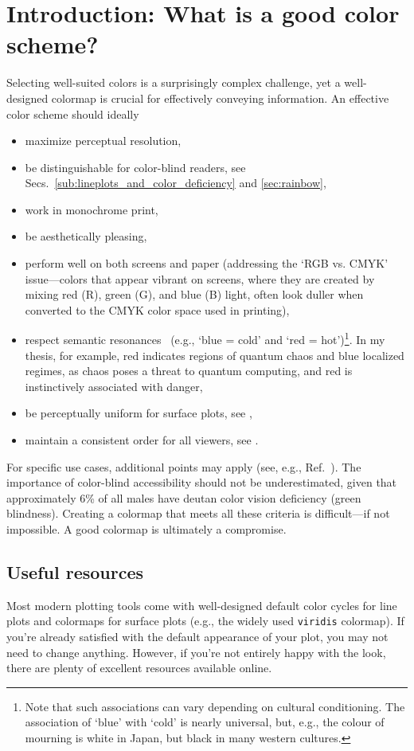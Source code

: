 \section{Introduction: What is a good color scheme?}
Selecting well-suited colors is a surprisingly complex challenge, yet a well-designed colormap is crucial for effectively conveying information. An effective color scheme should ideally
\begin{itemize}[itemsep = 1pt]
	\item maximize perceptual resolution,
    \item be distinguishable for color-blind readers, see Secs.~\ref{sub:lineplots_and_color_deficiency} and \ref{sec:rainbow},
    \item work in monochrome print,
    \item be aesthetically pleasing,
    \item perform well on both screens and paper (addressing the `RGB vs. CMYK' issue---colors that appear vibrant on screens, where they are created by mixing red (R), green (G), and blue (B) light, often look duller when converted to the CMYK color space used in printing),
    \item respect semantic resonances~\cite{linSelectingSemanticallyResonantColors2013} (e.g., `blue = cold' and `red = hot')\footnote{Note that such associations can vary depending on cultural conditioning. The association of `blue' with `cold' is nearly universal, but, e.g., the colour of mourning is white in Japan, but black in many western cultures.}. In my thesis, for example, red indicates regions of quantum chaos and blue localized regimes, as chaos poses a threat to quantum computing, and red is instinctively associated with danger,
    \item be perceptually uniform for surface plots, see ,
    \item maintain a consistent order for all viewers, see .
\end{itemize}

For specific use cases, additional points may apply (see, e.g., Ref.~\cite{moreland2009}). The importance of color-blind accessibility should not be underestimated, given that approximately 6\% of all males have deutan color vision deficiency (green blindness).
Creating a colormap that meets all these criteria is difficult---if not impossible. A good colormap is ultimately a compromise.

\subsection{Useful resources}
Most modern plotting tools come with well-designed default color cycles for line plots and colormaps for surface plots (e.g., the widely used \verb|viridis| colormap). If you're already satisfied with the default appearance of your plot, you may not need to change anything. However, if you're not entirely happy with the look, there are plenty of excellent resources available online.

